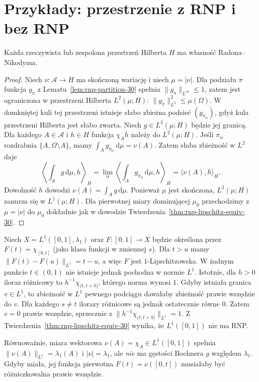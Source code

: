 \section{Przykłady: przestrzenie z RNP i bez RNP}
\label{sec:rnp-examples-30}
\begin{twierdzenie}
\label{thm:hilbert-rnp-30}
Każda rzeczywista lub zespolona przestrzeń Hilberta $H$
ma własność Radona--Nikodyma.
\end{twierdzenie}
\begin{proof}
Niech $\nu:\mathcal A\to H$ ma skończoną wariację
i niech $\mu=|\nu|$. Dla podziału $\pi$ funkcja
$g_\pi$ z Lematu~\ref{lem:rnp-partition-30} spełnia
$\|g_\pi\|_{L^\infty}\le1$, zatem jest ograniczona
w przestrzeni Hilberta $L^2(\mu;H)$:
$\|g_\pi\|_{L^2}^2\le\mu(\Omega)$.
W domkniętej kuli tej przestrzeni istnieje
słabo zbieżna podsieć $(g_{\pi_\alpha})$,
gdyż kula przestrzeni Hilberta jest słabo zwarta.
Niech $g\in L^2(\mu;H)$ będzie jej granicą.
Dla każdego $A\in\mathcal A$ i $h\in H$ funkcja
$\chi_A h$ należy do $L^2(\mu;H)$. Jeśli
$\pi_\alpha$ rozdrabnia $\{A,\Omega\setminus A\}$,
mamy $\int_Ag_{\pi_\alpha}\,\mathrm d\mu=\nu(A)$.
Zatem słaba zbieżność w $L^2$ daje
\[
 \left\langle\int_Ag\,\mathrm d\mu,h\right\rangle_H
 =\lim_\alpha\left\langle
 \int_Ag_{\pi_\alpha}\,\mathrm d\mu,h\right\rangle_H
 =\langle\nu(A),h\rangle_H.
\]
Dowolność $h$ dowodzi $\nu(A)=\int_Ag\,\mathrm d\mu$.
Ponieważ $\mu$ jest skończona, $L^2(\mu;H)$
zanurza się w $L^1(\mu;H)$.
Dla pierwotnej miary dominującej $\mu_0$
przechodzimy z $\mu=|\nu|$ do $\mu_0$ dokładnie jak
w dowodzie Twierdzenia~\ref{thm:rnp-lipschitz-equiv-30}.
\end{proof}

\begin{przyklad}
\label{ex:L1-no-RNP-30}
Niech $X=L^1([0,1],\lambda_1)$ oraz
$F:[0,1]\to X$ będzie określona przez
$F(t)=\chi_{[0,t]}$ (jako klasa funkcji w zmiennej $s$).
Dla $t>u$ mamy $\|F(t)-F(u)\|_{L^1}=t-u$,
a więc $F$ jest $1$-Lipschitzowska.
W żadnym punkcie $t\in(0,1)$ nie istnieje jednak
pochodna w normie $L^1$. Istotnie, dla $h>0$
iloraz różnicowy to
$h^{-1}\chi_{(t,t+h]}$, którego norma wynosi $1$.
Gdyby istniała granica $v\in L^1$, to zbieżność
w $L^1$ pewnego podciągu dawałaby zbieżność
prawie wszędzie do $v$. Dla każdego $s\ne t$
ilorazy różnicowe są jednak ostatecznie równe $0$.
Zatem $v=0$ prawie wszędzie, sprzecznie z
$\|h^{-1}\chi_{(t,t+h]}\|_{L^1}=1$.
Z Twierdzenia~\ref{thm:rnp-lipschitz-equiv-30}
wynika, że $L^1([0,1])$ nie ma RNP.

Równoważnie, miara wektorowa
$\nu(A)=\chi_A\in L^1([0,1])$ spełnia
$\|\nu(A)\|_{L^1}=\lambda_1(A)$ i
$|\nu|=\lambda_1$, ale \emph{nie} ma gęstości
Bochnera $g$ względem $\lambda_1$.
Gdyby miała, jej funkcja pierwotna $F(t)=\nu([0,t])$
musiałaby być różniczkowalna prawie wszędzie.
\end{przyklad}

